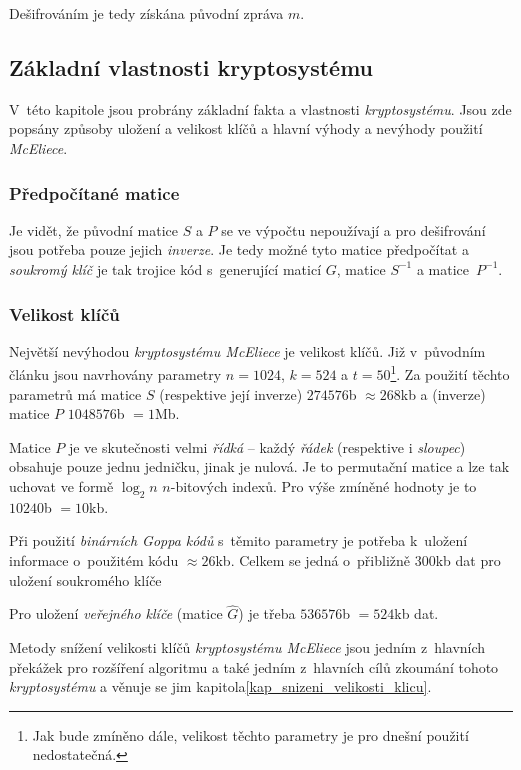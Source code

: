 \documentclass[thesis=M,czech,hidelinks]{FITthesis}[2012/06/26]
\newcommand{\0}{{\textcolor[gray]{0.80}{0}}}
\begin{document}
Dešifrováním je tedy získána původní zpráva $m$.

\subsection{Základní vlastnosti kryptosystému}
V~této kapitole jsou probrány základní fakta a vlastnosti \emph{kryptosystému}.
Jsou zde popsány způsoby uložení a velikost klíčů a hlavní výhody a nevýhody
použití \emph{McEliece}.

\subsubsection{Předpočítané matice}
Je vidět, že původní matice $S$ a $P$ se ve výpočtu nepoužívají a pro
dešifrování jsou potřeba pouze jejich \emph{inverze}. Je tedy možné tyto matice
předpočítat a \emph{soukromý klíč} je tak trojice kód s~generující maticí $G$,
matice $S^{-1}$ a matice~$P^{-1}$.

\subsubsection{Velikost klíčů}
Největší nevýhodou \emph{kryptosystému McEliece} je velikost klíčů. Již
v~původním článku jsou navrhovány parametry $n=1024$, $k=524$ a $t=50$\footnote{
    Jak bude zmíněno dále, velikost těchto parametry je pro dnešní použití
    nedostatečná.
}. Za použití těchto parametrů má matice $S$ (respektive její inverze)
$274576$\;b $\approx 268$\;kb a (inverze) matice $P$ $1048576$\;b $= 1$\;Mb.

Matice $P$ je ve skutečnosti velmi \emph{řídká} -- každý \emph{řádek}
(respektive i \emph{sloupec}) obsahuje pouze jednu jedničku, jinak je nulová. Je
to permutační matice a lze tak uchovat ve formě $\log_2 n$ $n$-bitových indexů.
Pro výše zmíněné hodnoty je to $10240$\;b $=10$\;kb.

Při použití \emph{binárních Goppa kódů} s~těmito parametry je potřeba k~uložení
informace o~použitém kódu $\approx 26$\;kb. Celkem se jedná o~přibližně
$300$\;kb dat pro uložení soukromého klíče

Pro uložení \emph{veřejného klíče} (matice $\hat{G}$) je třeba $536576$\;b
$=524$\;kb dat.

Metody snížení velikosti klíčů \emph{kryptosystému McEliece} jsou jedním
z~hlavních překážek pro rozšíření algoritmu a také jedním z~hlavních cílů
zkoumání tohoto \emph{kryptosystému} a věnuje se jim
kapitola\ref{kap_snizeni_velikosti_klicu}.
\end{document}
